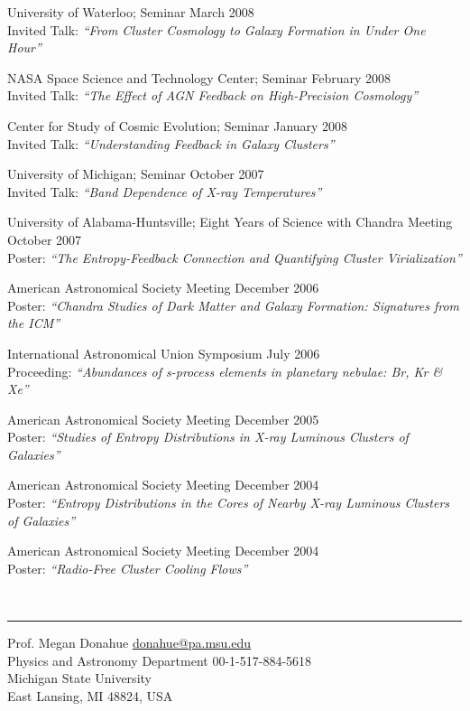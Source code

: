 \documentclass[12pt]{cv}
\newcommand{\myhead}{Cavagnolo, Curriculum Vitae}
\begin{document}
University of Waterloo; Seminar \hfill March 2008\\
Invited Talk: {\textit{``From Cluster Cosmology to Galaxy Formation in Under One Hour''}}

NASA Space Science and Technology Center; Seminar \hfill February 2008\\
Invited Talk: {\textit{``The Effect of AGN Feedback on High-Precision Cosmology''}}

Center for Study of Cosmic Evolution; Seminar \hfill January 2008\\
Invited Talk: {\textit{``Understanding Feedback in Galaxy Clusters''}}

University of Michigan; Seminar \hfill October 2007\\
Invited Talk: {\textit{``Band Dependence of X-ray Temperatures''}}

University of Alabama-Huntsville; Eight Years of Science with Chandra Meeting \hfill October 2007\\
Poster: {\textit{``The Entropy-Feedback Connection and Quantifying Cluster Virialization''}}

American Astronomical Society Meeting \hfill December 2006\\
Poster: {\textit{``Chandra Studies of Dark Matter and Galaxy Formation: Signatures from the ICM''}}

International Astronomical Union Symposium \hfill July 2006\\
Proceeding: {\textit{``Abundances of s-process elements in planetary nebulae: Br, Kr \& Xe''}}

American Astronomical Society Meeting \hfill December 2005\\
Poster: {\textit{``Studies of Entropy Distributions in X-ray Luminous Clusters of Galaxies''}}

American Astronomical Society Meeting \hfill December 2004\\
Poster: {\textit{``Entropy Distributions in the Cores of Nearby X-ray Luminous Clusters of Galaxies''}}

American Astronomical Society Meeting \hfill December 2004\\
Poster: {\textit{``Radio-Free Cluster Cooling Flows''}}

\markright{\myhead}
{\large{}}\vspace{-0.3cm}\\
\rule{\linewidth}{0.5pt}
Prof. Megan Donahue \hfill \href{mailto:donahue@pa.msu.edu}{donahue@pa.msu.edu}\\
Physics and Astronomy Department \hfill 00-1-517-884-5618\\
Michigan State University\\
East Lansing, MI 48824, USA
\end{document}
